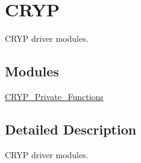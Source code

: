 \hypertarget{group___c_r_y_p}{\section{C\-R\-Y\-P}
\label{group___c_r_y_p}
}


C\-R\-Y\-P driver modules.  


\subsection*{Modules}
\begin{DoxyCompactItemize}
\item 
\hyperlink{group___c_r_y_p___private___functions}{C\-R\-Y\-P\-\_\-\-Private\-\_\-\-Functions}
\end{DoxyCompactItemize}


\subsection{Detailed Description}
C\-R\-Y\-P driver modules. 